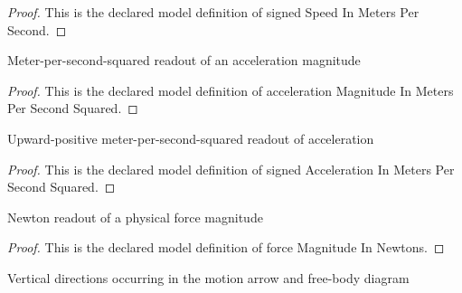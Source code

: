 \begin{proof}
  This is the declared model definition of signed Speed In Meters Per Second.
\end{proof}
\begin{definition}
  \label{def:physics:phyx-mini-0803:phyxminiproblems-problemphyxmini0803-accelerationmagnitudeinmeterspersecondsquared}
  Meter-per-second-squared readout of an acceleration magnitude
\end{definition}
\begin{proof}
  This is the declared model definition of acceleration Magnitude In Meters Per Second Squared.
\end{proof}
\begin{definition}
  \label{def:physics:phyx-mini-0803:phyxminiproblems-problemphyxmini0803-signedaccelerationinmeterspersecondsquared}
  Upward-positive meter-per-second-squared readout of acceleration
\end{definition}
\begin{proof}
  This is the declared model definition of signed Acceleration In Meters Per Second Squared.
\end{proof}
\begin{definition}
  \label{def:physics:phyx-mini-0803:phyxminiproblems-problemphyxmini0803-forcemagnitudeinnewtons}
  Newton readout of a physical force magnitude
\end{definition}
\begin{proof}
  This is the declared model definition of force Magnitude In Newtons.
\end{proof}
\begin{definition}
  \label{def:physics:phyx-mini-0803:phyxminiproblems-problemphyxmini0803-verticaldirection}
  Vertical directions occurring in the motion arrow and free-body diagram
\end{definition}
